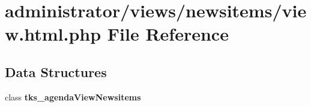 \section{administrator/views/newsitems/view.html.\+php File Reference}
\label{administrator_2views_2newsitems_2view_8html_8php}
\subsection*{Data Structures}
\begin{DoxyCompactItemize}
\item 
class \textbf{ tks\+\_\+agenda\+View\+Newsitems}
\end{DoxyCompactItemize}
